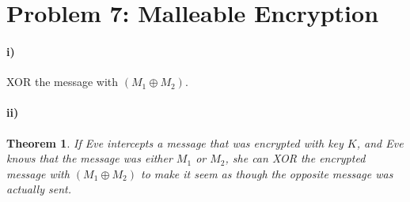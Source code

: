 \documentclass[10pt,letter]{article}
\newtheorem*{thm}{Theorem}
\begin{document}
\section*{Problem 7: Malleable Encryption}
\paragraph{i)} XOR the message with $(M_1 \oplus M_2)$. 
\paragraph{ii)}
\begin{thm}
  If Eve intercepts a message that was encrypted with key $K$, and Eve knows that the message was either $M_1$ or $M_2$, she can XOR the encrypted message with $(M_1 \oplus M_2)$ to make it seem as though the opposite message was actually sent.
\end{thm}
\end{document}

